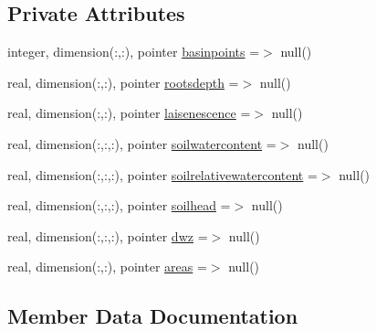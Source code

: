 \subsection*{Private Attributes}
\begin{DoxyCompactItemize}
\item 
integer, dimension(\+:,\+:), pointer \mbox{\hyperlink{structmoduleirrigation_1_1t__irrigationdata_a639fa614181280507a11f5e8c82964b6}{basinpoints}} =$>$ null()
\item 
real, dimension(\+:,\+:), pointer \mbox{\hyperlink{structmoduleirrigation_1_1t__irrigationdata_a60642edc18b2f122c5c9fef324c63ae9}{rootsdepth}} =$>$ null()
\item 
real, dimension(\+:,\+:), pointer \mbox{\hyperlink{structmoduleirrigation_1_1t__irrigationdata_a74a8e306012be94cb110d3959c6f6f44}{laisenescence}} =$>$ null()
\item 
real, dimension(\+:,\+:,\+:), pointer \mbox{\hyperlink{structmoduleirrigation_1_1t__irrigationdata_ae10e22500a153a67905ba20f886b4389}{soilwatercontent}} =$>$ null()
\item 
real, dimension(\+:,\+:,\+:), pointer \mbox{\hyperlink{structmoduleirrigation_1_1t__irrigationdata_a0eba5712121b68fbedb34cb1dfef6d9e}{soilrelativewatercontent}} =$>$ null()
\item 
real, dimension(\+:,\+:,\+:), pointer \mbox{\hyperlink{structmoduleirrigation_1_1t__irrigationdata_abec1911a4aa3136e0441baf8b3543f34}{soilhead}} =$>$ null()
\item 
real, dimension(\+:,\+:,\+:), pointer \mbox{\hyperlink{structmoduleirrigation_1_1t__irrigationdata_af66f7bb801888ccaaf66406068152ed5}{dwz}} =$>$ null()
\item 
real, dimension(\+:,\+:), pointer \mbox{\hyperlink{structmoduleirrigation_1_1t__irrigationdata_a5856f5bbe8162f9009d794ee363f9a4b}{areas}} =$>$ null()
\end{DoxyCompactItemize}


\subsection{Member Data Documentation}
\mbox{\label{structmoduleirrigation_1_1t__irrigationdata_a5856f5bbe8162f9009d794ee363f9a4b}} 
